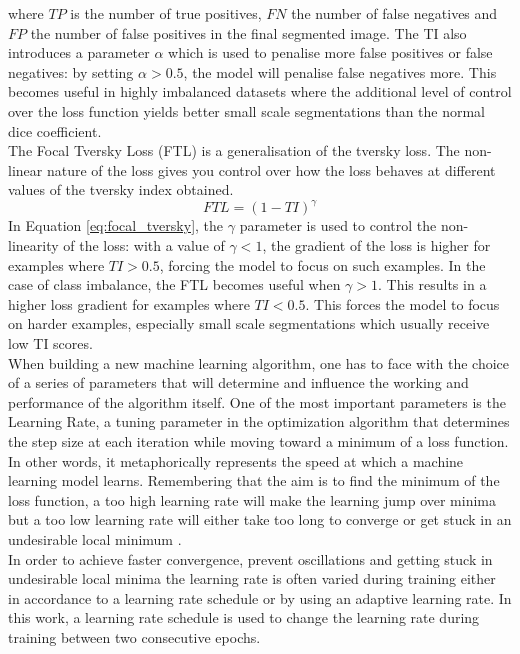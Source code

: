\documentclass[12pt]{extarticle}
\begin{document}
\noindent where $TP$ is the number of true positives, $FN$ the number of false negatives and $FP$ the number of false positives in the final segmented image. The TI also introduces a parameter $\alpha$ which is used to penalise more false positives or false negatives: by setting $\alpha > 0.5$, the model will penalise false negatives more. 
This becomes useful in highly imbalanced datasets where the additional level of control over the loss function yields better small scale segmentations than the normal dice coefficient.\\[4pt]
The Focal Tversky Loss (FTL) is a generalisation of the tversky loss. The non-linear nature of the loss gives you control over how the loss behaves at different values of the tversky index obtained.
\begin{equation}
FTL = \left( 1 - TI \right) ^{\gamma}
\label{eq:focal_tversky}
\end{equation}
In Equation \eqref{eq:focal_tversky}, the $\gamma$ parameter is used to control the non-linearity of the loss: with a value of $\gamma < 1$, the gradient of the loss is higher for examples where $TI > 0.5$, forcing the model to focus on such examples.
In the case of class imbalance, the FTL becomes useful when $\gamma > 1$. This results in a higher loss gradient for examples where $TI < 0.5$. This forces the model to focus on harder examples, especially small scale segmentations which usually receive low TI scores.\\[6pt]
When building a new machine learning algorithm, one has to face with the choice of a series of parameters that will determine and influence the working and performance of the algorithm itself. 
One of the most important parameters is the Learning Rate, a tuning parameter in the optimization algorithm that determines the step size at each iteration while moving toward a minimum of a loss function.
In other words, it metaphorically represents the speed at which a machine learning model learns.
Remembering that the aim is to find the minimum of the loss function, a too high learning rate will make the learning jump over minima but a too low learning rate will either take too long to converge or get stuck in an undesirable local minimum \cite{deep_learning}.\\
In order to achieve faster convergence, prevent oscillations and getting stuck in undesirable local minima the learning rate is often varied during training either in accordance to a learning rate schedule or by using an adaptive learning rate. In this work, a learning rate schedule is used to change the learning rate during training between two consecutive epochs. 
\end{document}
